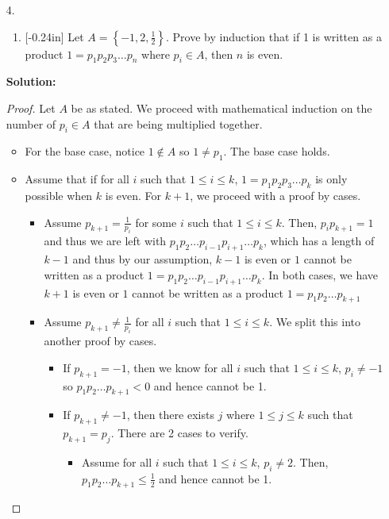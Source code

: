 \documentclass[letterpaper,12pt]{article}
\newcommand{\set}[1]{\left\{ #1 \right\}}
\theoremstyle{definition}
\begin{document}
\begin{enumerate}
    \item[4.]
 \begin{enumerate}
     \item  \reversemarginpar{}[-0.24in] 
 Let $A = \set{-1, 2, \frac{1}{2}}$. Prove by induction that if 1 is written as a product $1=p_1p_2p_3\ldots p_n$ where $p_i \in A$, then $n$ is even. 
 \end{enumerate}
 \begin{mdframed}
     \textbf{Solution:}
     \begin{proof}
         Let $A$ be as stated. We proceed with mathematical induction on the number of $p_i \in A$ that are being multiplied together. \begin{itemize}
             \item For the base case, notice $1 \notin A$ so $1 \neq p_1$. The base case holds.
             \item Assume that if for all $i$ such that $1 \leq i \leq k$, $1=p_1p_2p_3\ldots p_k$ is only possible when $k$ is even. For $k +1$, we proceed with a proof by cases.
             \begin{itemize}
                 \item Assume $p_{k+1} = \frac{1}{p_i}$ for some $i$ such that $1 \leq i \leq k$. Then, $p_i p_{k+1} = 1$ and thus we are left with $p_1p_2 \ldots p_{i-1}p_{i+1} \ldots p_k$, which has a length of $k-1$ and thus by our assumption, $k-1$ is even or $1$ cannot be written as a product $1 = p_1p_2 \ldots p_{i-1}p_{i+1} \ldots p_k$. In both cases, we have $k+1$ is even or $1$ cannot be written as a product $1 = p_1p_2 \ldots p_{k+1}$
                 \item Assume $p_{k+1} \neq \frac{1}{p_i}$ for all $i$ such that $1 \leq i \leq k$. We split this into another proof by cases. \begin{itemize}
                     \item If $p_{k+1} = -1$, then we know for all $i$ such that $1 \leq i \leq k$, $p_i \neq -1$ so $p_1p_2 \ldots p_{k+1} < 0$ and hence cannot be 1.
                     \item If $p_{k+1} \neq -1$, then there exists $j$ where $1 \leq j \leq k$ such that $p_{k+1} = p_j$. There are 2 cases to verify. \begin{itemize}
                         \item Assume for all $i$ such that $1 \leq i \leq k$, $p_i \neq 2$. Then, $p_1p_2 \ldots p_{k+1} \leq \frac{1}{2}$ and hence cannot be 1.

\end{itemize}
\end{itemize}
\end{itemize}
\end{itemize}
\end{proof}
\end{mdframed}
\end{enumerate}
\end{document}
